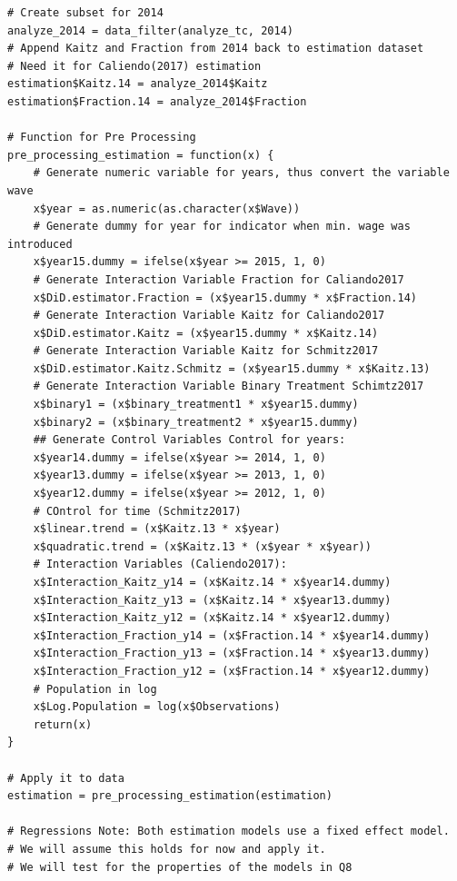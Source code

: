 \documentclass[a4paper]{article}
\begin{document}
{\begin{lstlisting}
# Create subset for 2014
analyze_2014 = data_filter(analyze_tc, 2014)
# Append Kaitz and Fraction from 2014 back to estimation dataset 
# Need it for Caliendo(2017) estimation
estimation$Kaitz.14 = analyze_2014$Kaitz
estimation$Fraction.14 = analyze_2014$Fraction

# Function for Pre Processing
pre_processing_estimation = function(x) {
    # Generate numeric variable for years, thus convert the variable wave
    x$year = as.numeric(as.character(x$Wave))
    # Generate dummy for year for indicator when min. wage was introduced
    x$year15.dummy = ifelse(x$year >= 2015, 1, 0)
    # Generate Interaction Variable Fraction for Caliando2017
    x$DiD.estimator.Fraction = (x$year15.dummy * x$Fraction.14)
    # Generate Interaction Variable Kaitz for Caliando2017
    x$DiD.estimator.Kaitz = (x$year15.dummy * x$Kaitz.14)
    # Generate Interaction Variable Kaitz for Schmitz2017
    x$DiD.estimator.Kaitz.Schmitz = (x$year15.dummy * x$Kaitz.13)
    # Generate Interaction Variable Binary Treatment Schimtz2017
    x$binary1 = (x$binary_treatment1 * x$year15.dummy)
    x$binary2 = (x$binary_treatment2 * x$year15.dummy)
    ## Generate Control Variables Control for years:
    x$year14.dummy = ifelse(x$year >= 2014, 1, 0)
    x$year13.dummy = ifelse(x$year >= 2013, 1, 0)
    x$year12.dummy = ifelse(x$year >= 2012, 1, 0)
    # COntrol for time (Schmitz2017)
    x$linear.trend = (x$Kaitz.13 * x$year)
    x$quadratic.trend = (x$Kaitz.13 * (x$year * x$year))
    # Interaction Variables (Caliendo2017):
    x$Interaction_Kaitz_y14 = (x$Kaitz.14 * x$year14.dummy)
    x$Interaction_Kaitz_y13 = (x$Kaitz.14 * x$year13.dummy)
    x$Interaction_Kaitz_y12 = (x$Kaitz.14 * x$year12.dummy)
    x$Interaction_Fraction_y14 = (x$Fraction.14 * x$year14.dummy)
    x$Interaction_Fraction_y13 = (x$Fraction.14 * x$year13.dummy)
    x$Interaction_Fraction_y12 = (x$Fraction.14 * x$year12.dummy)
    # Population in log
    x$Log.Population = log(x$Observations)
    return(x)
}

# Apply it to data
estimation = pre_processing_estimation(estimation)

# Regressions Note: Both estimation models use a fixed effect model. 
# We will assume this holds for now and apply it. 
# We will test for the properties of the models in Q8


\end{lstlisting}}
\end{document}
